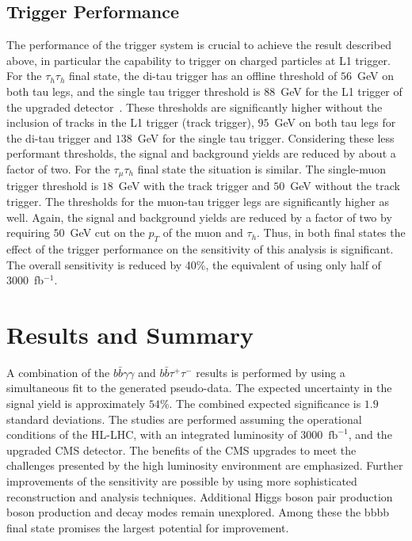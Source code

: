 \subsection{Trigger Performance}
The performance of the trigger system is crucial to achieve the result
described above, in particular the capability to trigger on charged
particles at L1 trigger. For the $\tau_{h}\tau_{h}$ final state, the
di-tau trigger has an offline threshold of $56$~GeV on both tau legs,
and the single tau trigger threshold is $88$~GeV for the L1 trigger  of the \phasetwo upgraded detector~\cite{Butler:2020886}.  These thresholds are significantly higher without the inclusion of tracks in the L1 trigger (track trigger), $95$~GeV on both tau legs for the di-tau trigger and $138$~GeV for the single tau trigger. Considering these less performant thresholds, the signal and background yields are reduced by about a factor of
two. For the $\tau_{\mu}\tau_{h}$ final state the situation is similar. The single-muon trigger
threshold is $18$~GeV with the track trigger and $50$~GeV without the track
trigger. The thresholds for the muon-tau trigger legs are significantly
higher as well. Again, the signal and background yields are reduced by a factor of two
by requiring $50$~GeV cut on the $p_T$ of the muon and $\tau_h$.
Thus, in both final states the effect of the trigger performance on the sensitivity of this analysis is significant. The overall sensitivity is
reduced by 40\%, the equivalent of  using only half of 3000~fb$^{-1}$.

\section{Results and Summary}
A combination of the  $b\bar{b}\gamma\gamma$ and $b\bar{b}\tau^{+}\tau^{-}$ results is performed by using a simultaneous fit to the generated pseudo-data. The expected uncertainty in the signal yield is approximately $54\%$. The combined expected significance is $1.9$ standard deviations. The studies are performed assuming the operational conditions of the HL-LHC, with an integrated luminosity of 3000~$\mathrm{fb}^{-1}$, and the upgraded CMS detector.  The benefits of the CMS \phasetwo upgrades to meet the challenges presented by the high luminosity environment are emphasized. Further improvements of the sensitivity are possible by using more sophisticated reconstruction and analysis techniques. Additional Higgs boson pair production boson production and decay modes remain unexplored. Among these the bbbb final state promises the largest potential for improvement.
